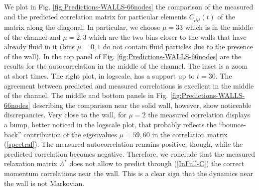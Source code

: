 \documentclass[b5paper,openright,10pt]{book}
\begin{document}
We plot in Fig. \ref{fig:Predictions-WALLS-66nodes} the  comparison of the measured and the
predicted correlation matrix  for particular elements $C_{\mu\mu}(t)$
of the matrix  along the diagonal.  In particular,  we choose $\mu=33$
which is in the middle of the  channel and $\mu=2,3$ which are the two
bins closer to the walls that have already fluid in it (bins $\mu=0,1$
do not contain  fluid particles due to the presence  of the wall).  In
the  top  panel  of  Fig.   \ref{fig:Predictions-WALLS-66nodes} are  the  results  for  the
autocorrelation in the middle of  the channel. The inset is a zoom at short times. The right plot, in logscale,
has  a support  up  to  $t=30$. The  agreement  between predicted  and
measured correlations is excellent in  the middle of the channel.  The
middle  and  bottom  panels  in Fig.   \ref{fig:Predictions-WALLS-66nodes}  describing  the
comparison   near   the   solid   wall,   however,   show   noticeable
discrepancies.   Very close  to  the wall,  for  $\mu=2$ the  measured
correlation displays  a bump,  better noticed  in the  logscale plot,
that  probably  reflects  the   ``bounce-back''  contribution  of  the
eigenvalues  $\mu=59,60$ in  the correlation  matrix (\ref{spectral}).
The  measured  autocorrelation  remains positive,  though,  while  the
predicted correlation  becomes negative.  Therefore, we  conclude that
the measured relaxation  matrix $\Lambda^*$ does not  allow to predict
through (\ref{InFull-C})  the correct  momentum correlations  near the
wall.   This is a clear sign  that the  dynamics near  the wall  is not
Markovian.
\end{document}
